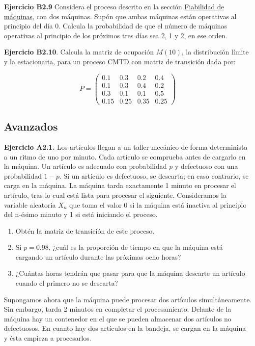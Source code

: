 \documentclass[
]{book}
\providecommand{\tightlist}{%
  \setlength{\itemsep}{0pt}\setlength{\parskip}{0pt}}
\theoremstyle{definition}
\theoremstyle{definition}
\theoremstyle{definition}
\theoremstyle{definition}
\theoremstyle{remark}
\begin{document}
\textbf{Ejercicio B2.9} Considera el proceso descrito en la sección \protect\hyperlink{fiabilidad}{Fiabilidad de máquinas}, con dos máquinas. Supón que ambas máquinas están operativas al principio del día 0. Calcula la probabilidad de que el número de máquinas operativas al principio de los próximos tres días sea 2, 1 y 2, en ese orden.

\textbf{Ejercicio B2.10}. Calcula la matriz de ocupación \(M(10)\), la distribución límite y la estacionaria, para un proceso CMTD con matriz de transición dada por:

\[P=\begin{pmatrix}
0.1 & 0.3 & 0.2 & 0.4 \\
0.1 & 0.3 & 0.4 & 0.2 \\
0.3 & 0.1 & 0.1 & 0.5 \\
0.15 & 0.25 & 0.35 & 0.25 
\end{pmatrix}\]

\hypertarget{avanzados-1}{%
\subsection{Avanzados}\label{avanzados-1}}

\textbf{Ejercicio A2.1.} Los artículos llegan a un taller mecánico de forma determinista a un ritmo de uno por minuto. Cada artículo se comprueba antes de cargarlo en la máquina. Un artículo es adecuado con probabilidad \(p\) y defectuoso con una probabilidad \(1-p\). Si un artículo es defectuoso, se descarta; en caso contrario, se carga en la máquina. La máquina tarda exactamente 1 minuto en procesar el artículo, tras lo cual está lista para procesar el siguiente. Consideramos la variable aleatoria \(X_n\) que toma el valor \(0\) si la máquina está inactiva al principio del n-ésimo minuto y 1 si está iniciando el proceso.

\begin{enumerate}
\def\labelenumi{\arabic{enumi}.}
\tightlist
\item
  Obtén la matriz de transición de este proceso.
\item
  Si \(p = 0.98\), ¿cuál es la proporción de tiempo en que la máquina está cargando un artículo durante las próximas ocho horas?
\item
  ¿Cuántas horas tendrán que pasar para que la máquina descarte un artículo cuando el primero no se descarta?
\end{enumerate}

Supongamos ahora que la máquina puede procesar dos artículos simultáneamente. Sin embargo, tarda 2 minutos en completar el procesamiento. Delante de la máquina hay un contenedor en el que se pueden almacenar dos artículos no defectuosos. En cuanto hay dos artículos en la bandeja, se cargan en la máquina y ésta empieza a procesarlos.
\end{document}
